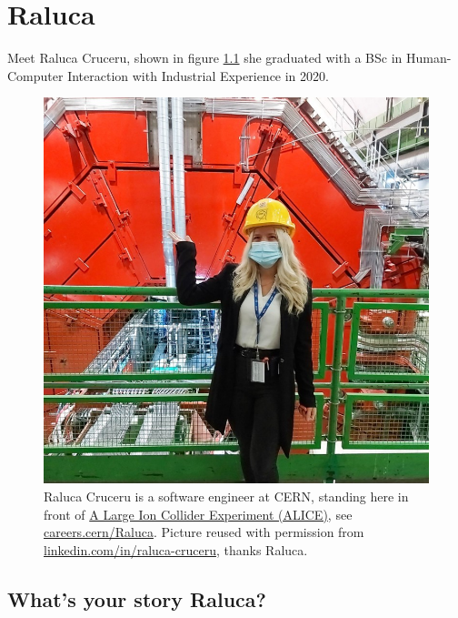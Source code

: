 \documentclass[
]{book}
\begin{document}
\hypertarget{raluca}{%
\chapter{Raluca}\label{raluca}}

Meet Raluca Cruceru, shown in figure \ref{fig:raluca-fig} she graduated with a BSc in Human-Computer Interaction with Industrial Experience in 2020.

\begin{figure}

{\centering \includegraphics[width=1\linewidth]{images/raluca} 

}

\caption{Raluca Cruceru is a software engineer at CERN, standing here in front of \href{https://en.wikipedia.org/wiki/ALICE_experiment}{A Large Ion Collider Experiment (ALICE)}, see \href{https://careers.cern/Raluca}{careers.cern/Raluca}. Picture reused with permission from \href{https://www.linkedin.com/in/raluca-cruceru/}{linkedin.com/in/raluca-cruceru}, thanks Raluca.}\label{fig:raluca-fig}
\end{figure}



\hypertarget{ralucastory}{%
\section{What's your story Raluca?}\label{ralucastory}}
\end{document}
